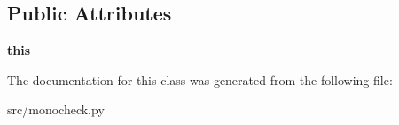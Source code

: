 \subsection*{Public Attributes}
\begin{DoxyCompactItemize}
\item 
\hypertarget{classmonocheck_1_1Matrix_aaa81a06876b224d4caf8663c14444835}{
{\bfseries this}}
\label{d3/d15/classmonocheck_1_1Matrix_aaa81a06876b224d4caf8663c14444835}

\end{DoxyCompactItemize}


The documentation for this class was generated from the following file:\begin{DoxyCompactItemize}
\item 
src/monocheck.py\end{DoxyCompactItemize}
